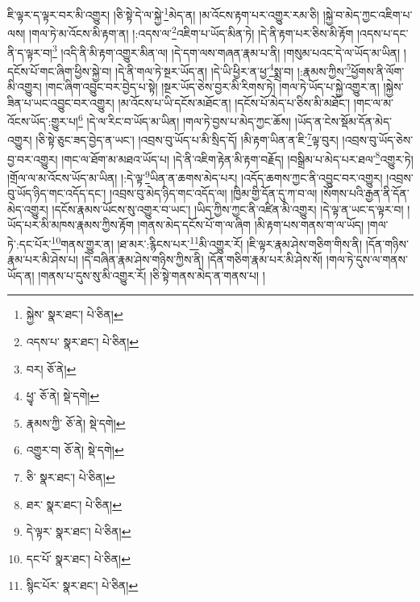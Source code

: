 ཇི་ལྟར་ད་ལྟར་བར་མི་འགྱུར། །ཅི་སྟེ་དེ་ལ་སྐྱེ་\footnote{སྐྱེས་  སྣར་ཐང་།  པེ་ཅིན། }མེད་ན། །མ་འོངས་རྟག་པར་འགྱུར་རམ་ཅི། །སྐྱེ་བ་མེད་ཀྱང་འཇིག་པ་ལས། །གལ་ཏེ་མ་འོངས་མི་རྟག་ན། །:འདས་ལ་\footnote{འདས་པ་  སྣར་ཐང་།  པེ་ཅིན། }འཇིག་པ་ཡོད་མིན་ཏེ། །དེ་ནི་རྟག་པར་ཅིས་མི་རྟོག །འདས་པ་དང་ནི་ད་ལྟར་བ།\footnote{བར།  ཅོ་ནེ། } །འདི་ནི་མི་རྟག་འགྱུར་མིན་ལ། །དེ་དག་ལས་གཞན་རྣམ་པ་ནི། །གསུམ་པའང་དེ་ལ་ཡོད་མ་ཡིན། །དངོས་པོ་གང་ཞིག་ཕྱིས་སྐྱེ་བ། །དེ་ནི་གལ་ཏེ་སྔར་ཡོད་ན། །དེ་ཡི་ཕྱིར་ན་ཕྱ་\footnote{ཕྱྭ་  ཅོ་ནེ།  སྡེ་དགེ། }སྨྲ་བ། །:རྣམས་ཀྱིས་\footnote{རྣམས་ཀྱི་  ཅོ་ནེ།  སྡེ་དགེ། }ཕྱོགས་ནི་ལོག་མི་འགྱུར། །གང་ཞིག་འབྱུང་བར་བྱེད་པ་སྟེ། །སྔར་ཡོད་ཅེས་བྱར་མི་རིགས་ཏེ། །གལ་ཏེ་ཡོད་པ་སྐྱེ་འགྱུར་ན། །སྐྱེས་ཟིན་པ་ཡང་འབྱུང་བར་འགྱུར། །མ་འོངས་པ་ཡི་དངོས་མཐོང་ན། །དངོས་པོ་མེད་པ་ཅིས་མི་མཐོང་། །གང་ལ་མ་འོངས་ཡོད་:གྱུར་པ།\footnote{འགྱུར་བ།  ཅོ་ནེ།  སྡེ་དགེ། } །དེ་ལ་རིང་བ་ཡོད་མ་ཡིན། །གལ་ཏེ་བྱས་པ་མེད་ཀྱང་ཆོས། །ཡོད་ན་ངེས་སྡོམ་དོན་མེད་འགྱུར། །ཅི་སྟེ་ཅུང་ཟད་བྱེད་ན་ཡང་། །འབྲས་བུ་ཡོད་པ་མི་སྲིད་དོ། །མི་རྟག་ཡིན་ན་ཇི་\footnote{ཅི་  སྣར་ཐང་།  པེ་ཅིན། }ལྟ་བུར། །འབྲས་བུ་ཡོད་ཅེས་བྱ་བར་འགྱུར། །གང་ལ་ཐོག་མ་མཐའ་ཡོད་པ། །དེ་ནི་འཇིག་རྟེན་མི་རྟག་བརྗོད། །བསྒྲིམ་པ་མེད་པར་ཐལ་\footnote{ཐར་  སྣར་ཐང་།  པེ་ཅིན། }འགྱུར་ཏེ། །གྲོལ་ལ་མ་འོངས་ཡོད་མ་ཡིན། །:དེ་ལྟ་\footnote{དེ་ལྟར་  སྣར་ཐང་།  པེ་ཅིན། }ཡིན་ན་ཆགས་མེད་པར། །འདོད་ཆགས་ཀྱང་ནི་འབྱུང་བར་འགྱུར། །འབྲས་བུ་ཡོད་ཉིད་གང་འདོད་དང་། །འབྲས་བུ་མེད་ཉིད་གང་འདོད་ལ། །ཁྱིམ་གྱི་དོན་དུ་ཀ་བ་ལ། །སོགས་པའི་རྒྱན་ནི་དོན་མེད་འགྱུར། །དངོས་རྣམས་ཡོངས་སུ་འགྱུར་བ་ཡང་། །ཡིད་ཀྱིས་ཀྱང་ནི་འཛིན་མི་འགྱུར། །དེ་ལྟ་ན་ཡང་ད་ལྟར་བ། །ཡོད་པར་མི་མཁས་རྣམས་ཀྱིས་རྟོག །གནས་མེད་དངོས་པོ་ག་ལ་ཞིག །མི་རྟག་པས་གནས་ག་ལ་ཡོད། །གལ་ཏེ་:དང་པོར་\footnote{དང་པོ་  སྣར་ཐང་།  པེ་ཅིན། }གནས་གྱུར་ན། །ཐ་མར་:རྙིངས་པར་\footnote{སྙིང་པོར་  སྣར་ཐང་།  པེ་ཅིན། }མི་འགྱུར་རོ། །ཇི་ལྟར་རྣམ་ཤེས་གཅིག་གིས་ནི། །དོན་གཉིས་རྣམ་པར་མི་ཤེས་པ། །དེ་བཞིན་རྣམ་ཤེས་གཉིས་ཀྱིས་ནི། །དོན་གཅིག་རྣམ་པར་མི་ཤེས་སོ། །གལ་ཏེ་དུས་ལ་གནས་ཡོད་ན། །གནས་པ་དུས་སུ་མི་འགྱུར་རོ། །ཅི་སྟེ་གནས་མེད་ན་གནས་པ། །
